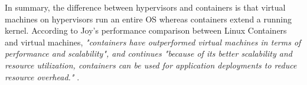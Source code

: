 \noindent
In summary, the difference between hypervisors and containers is that virtual machines on hypervisors run an entire OS whereas containers extend a running kernel. According to Joy's performance comparison between Linux Containers and virtual machines, \textit{"containers have outperformed virtual machines in terms of performance and scalability", and continues "because of its better scalability and resource utilization, containers can be used for application deployments to reduce resource overhead."} \cite[p. 346]{joy2015performance}.

